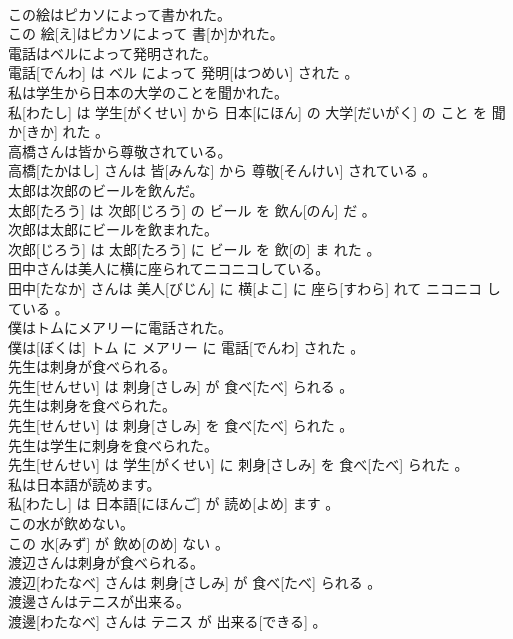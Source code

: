 \documentclass[8pt]{extreport}
\begin{document}
\begin{CJK}{UTF8}{min}
\\	この絵はピカソによって書かれた。	
\\	この 絵[え]はピカソによって 書[か]かれた。
\\	電話はベルによって発明された。	
\\	電話[でんわ] は ベル によって 発明[はつめい] された 。
\\	私は学生から日本の大学のことを聞かれた。	
\\	私[わたし] は 学生[がくせい] から 日本[にほん] の 大学[だいがく] の こと を 聞か[きか] れた 。
\\	高橋さんは皆から尊敬されている。	
\\	高橋[たかはし] さんは 皆[みんな] から 尊敬[そんけい] されている 。
\\	太郎は次郎のビールを飲んだ。	
\\	太郎[たろう] は 次郎[じろう] の ビール を 飲ん[のん] だ 。
\\	次郎は太郎にビールを飲まれた。	
\\	次郎[じろう] は 太郎[たろう] に ビール を 飲[の] ま れた 。
\\	田中さんは美人に横に座られてニコニコしている。	
\\	田中[たなか] さんは 美人[びじん] に 横[よこ] に 座ら[すわら] れて ニコニコ している 。
\\	僕はトムにメアリーに電話された。	
\\	僕は[ぼくは] トム に メアリー に 電話[でんわ] された 。
\\	先生は刺身が食べられる。	
\\	先生[せんせい] は 刺身[さしみ] が 食べ[たべ] られる 。
\\	先生は刺身を食べられた。	
\\	先生[せんせい] は 刺身[さしみ] を 食べ[たべ] られた 。
\\	先生は学生に刺身を食べられた。	
\\	先生[せんせい] は 学生[がくせい] に 刺身[さしみ] を 食べ[たべ] られた 。
\\	私は日本語が読めます。	
\\	私[わたし] は 日本語[にほんご] が 読め[よめ] ます 。
\\	この水が飲めない。	
\\	この 水[みず] が 飲め[のめ] ない 。
\\	渡辺さんは刺身が食べられる。	
\\	渡辺[わたなべ] さんは 刺身[さしみ] が 食べ[たべ] られる 。
\\	渡邊さんはテニスが出来る。	
\\	渡邊[わたなべ] さんは テニス が 出来る[できる] 。

\end{CJK}
\end{document}
